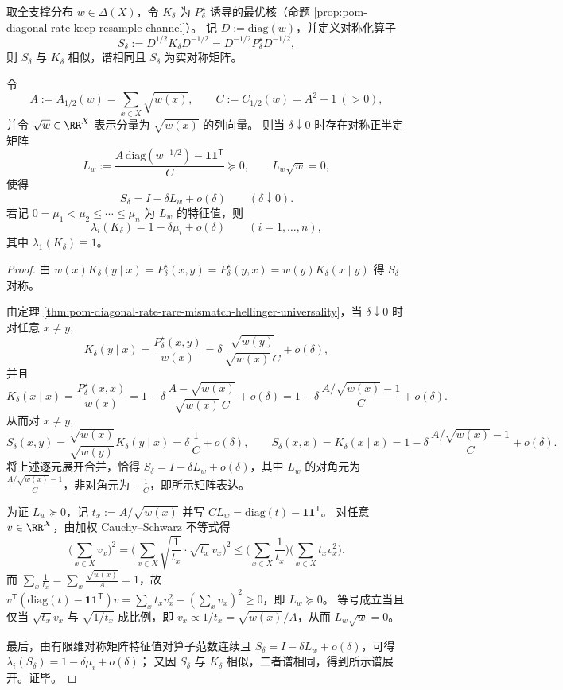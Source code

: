 \begin{theorem}\label{thm:pom-diagonal-rate-critical-line-laplacian-first-order}
取全支撑分布 \(w\in\Delta(X)\)，令 \(K_\delta\) 为 \(P^\star_\delta\) 诱导的最优核（命题 \ref{prop:pom-diagonal-rate-keep-resample-channel}）。
记 \(D:=\mathrm{diag}(w)\)，并定义对称化算子
\[
S_\delta:=D^{1/2}K_\delta D^{-1/2}=D^{-1/2}P^\star_\delta D^{-1/2},
\]
则 \(S_\delta\) 与 \(K_\delta\) 相似，谱相同且 \(S_\delta\) 为实对称矩阵。
\par
令
\[
A:=A_{1/2}(w)=\sum_{x\in X}\sqrt{w(x)},\qquad
C:=C_{1/2}(w)=A^2-1\ (>0),
\]
并令 \(\sqrt w\in\RR^X\) 表示分量为 \(\sqrt{w(x)}\) 的列向量。
则当 \(\delta\downarrow 0\) 时存在对称正半定矩阵
\[
L_w:=\frac{A\,\mathrm{diag}(w^{-1/2})-\mathbf 1\mathbf 1^{\mathsf T}}{C}\succeq 0,
\qquad
L_w\sqrt w=0,
\]
使得
\[
S_\delta=I-\delta L_w+o(\delta)\qquad(\delta\downarrow 0).
\]
若记 \(0=\mu_1<\mu_2\le\cdots\le\mu_n\) 为 \(L_w\) 的特征值，则
\[
\lambda_i(K_\delta)=1-\delta\mu_i+o(\delta)\qquad(i=1,\dots,n),
\]
其中 \(\lambda_1(K_\delta)\equiv 1\)。
\end{theorem}
\begin{proof}
由 \(w(x)K_\delta(y\mid x)=P^\star_\delta(x,y)=P^\star_\delta(y,x)=w(y)K_\delta(x\mid y)\) 得 \(S_\delta\) 对称。
\par
由定理 \ref{thm:pom-diagonal-rate-rare-mismatch-hellinger-universality}，当 \(\delta\downarrow 0\) 时对任意 \(x\ne y\),
\[
K_\delta(y\mid x)=\frac{P^\star_\delta(x,y)}{w(x)}
=\delta\,\frac{\sqrt{w(y)}}{\sqrt{w(x)}\,C}+o(\delta),
\]
并且
\[
K_\delta(x\mid x)=\frac{P^\star_\delta(x,x)}{w(x)}
=1-\delta\,\frac{A-\sqrt{w(x)}}{\sqrt{w(x)}\,C}+o(\delta)
=1-\delta\,\frac{A/\sqrt{w(x)}-1}{C}+o(\delta).
\]
从而对 \(x\ne y\),
\[
S_\delta(x,y)
=\frac{\sqrt{w(x)}}{\sqrt{w(y)}}K_\delta(y\mid x)
=\delta\,\frac{1}{C}+o(\delta),
\qquad
S_\delta(x,x)=K_\delta(x\mid x)=1-\delta\,\frac{A/\sqrt{w(x)}-1}{C}+o(\delta).
\]
将上述逐元展开合并，恰得 \(S_\delta=I-\delta L_w+o(\delta)\)，其中 \(L_w\) 的对角元为 \(\frac{A/\sqrt{w(x)}-1}{C}\)，非对角元为 \(-\frac{1}{C}\)，即所示矩阵表达。
\par
为证 \(L_w\succeq 0\)，记 \(t_x:=A/\sqrt{w(x)}\) 并写
\(
CL_w=\mathrm{diag}(t)-\mathbf 1\mathbf 1^{\mathsf T}
\)。
对任意 \(v\in\RR^X\)，由加权 Cauchy--Schwarz 不等式得
\[
\biggl(\sum_{x\in X}v_x\biggr)^2
=\biggl(\sum_{x\in X}\sqrt{\frac{1}{t_x}}\cdot \sqrt{t_x}\,v_x\biggr)^2
\le \biggl(\sum_{x\in X}\frac{1}{t_x}\biggr)\biggl(\sum_{x\in X}t_xv_x^2\biggr).
\]
而
\(
\sum_x\frac{1}{t_x}=\sum_x\frac{\sqrt{w(x)}}{A}=1
\)，故
\(
v^{\mathsf T}(\mathrm{diag}(t)-\mathbf 1\mathbf 1^{\mathsf T})v
=\sum_x t_xv_x^2-(\sum_x v_x)^2\ge 0
\)，即 \(L_w\succeq 0\)。
等号成立当且仅当 \(\sqrt{t_x}v_x\) 与 \(\sqrt{1/t_x}\) 成比例，即 \(v_x\propto 1/t_x=\sqrt{w(x)}/A\)，从而 \(L_w\sqrt w=0\)。
\par
最后，由有限维对称矩阵特征值对算子范数连续且 \(S_\delta=I-\delta L_w+o(\delta)\)，可得
\(
\lambda_i(S_\delta)=1-\delta\mu_i+o(\delta)
\)；
又因 \(S_\delta\) 与 \(K_\delta\) 相似，二者谱相同，得到所示谱展开。证毕。
\end{proof}


